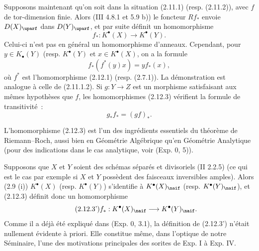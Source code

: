 Supposons maintenant qu'on soit dans la situation (2.11.1) (resp. (2.11.2)), avec \(f\) de tor-dimension finie. Alors (III 4.8.1 et 5.9 b)) le foncteur \(Rf_*\) envoie \(D(X)_{\uparf}\) dans \(D(Y)_{\uparf}\), et par suite définit un homomorphisme
\begin{equation}\tag{2.12.3}
 f_*:K^{\bullet}(X)\longrightarrow K^{\bullet}(Y).
\end{equation}
Celui-ci n'est pas en général un homomorphisme d'anneaux. Cependant, pour \(y\in K_{\bullet}(Y)\) (resp. \(K^{\bullet}(Y)\) et \(x\in K^{\bullet}(X)\), on a la formule
\begin{equation}\tag{2.12.4}
 f_*(f^*(y)x)=y f_*(x),
\end{equation}
où \(f^*\) est l'homomorphisme (2.12.1) (resp. (2.7.1)). La démonstration est analogue à celle de (2.11.1.2). Si \(g:Y\to Z\) est un morphisme satisfaisant aux mêmes hypothèses que \(f\), les homomorphismes (2.12.3) vérifient la formule de transitivité~:
\begin{equation}\tag{2.12.3.1}
 g_*f_*=(gf)_*.
\end{equation}

L'homomorphisme (2.12.3) est l'un des ingrédients essentiels du théorème de Riemann--Roch, aussi bien en Géométrie Algébrique qu'en Géométrie Analytique (pour des indications dans le cas analytique, voir (Exp. 0, 5)).

Supposons que \(X\) et \(Y\) soient des schémas séparés et divisoriels (II 2.2.5) (ce qui est le cas par exemple si \(X\) et \(Y\) possèdent des faisceaux inversibles amples). Alors (2.9 (i)) \(K^{\bullet}(X)\) (resp. \(K^{\bullet}(Y)\)) s'identifie à \(K^{\bullet}(X)_{\naif}\) (resp. \(K^{\bullet}(Y)_{\naif}\)), et (2.12.3) définit donc un homomorphisme
\begin{equation}\tag{2.12.3'}
 f_*:K^{\bullet}(X)_{\naif}\longrightarrow K^{\bullet}(Y)_{\naif}.
\end{equation}
Comme il a déjà été expliqué dans (Exp. 0, 3.1), la définition de (2.12.3') n'était nullement évidente à priori. Elle constitue même, dans l'optique de notre Séminaire, l'une des motivations principales des
sorites de Exp. I à Exp. IV.

